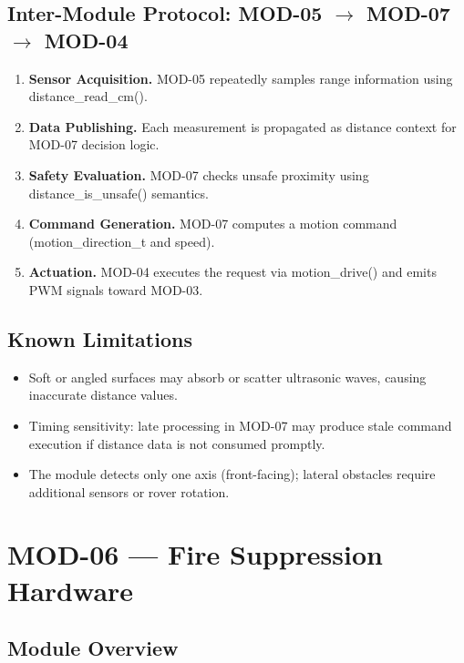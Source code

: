 \documentclass[12pt,a4paper]{article}
\newcommand{\fn}[1]{{\footnotesize\ttfamily #1}}
\begin{document}
\subsection{Inter-Module Protocol: MOD-05 $\rightarrow$ MOD-07 $\rightarrow$ MOD-04}

\begin{enumerate}[leftmargin=*, label=\textbf{Step \arabic*.}]
  \item \textbf{Sensor Acquisition.} MOD-05 repeatedly samples range information using \fn{distance\_read\_cm()}.
  \item \textbf{Data Publishing.} Each measurement is propagated as distance context for MOD-07 decision logic.
  \item \textbf{Safety Evaluation.} MOD-07 checks unsafe proximity using \fn{distance\_is\_unsafe()} semantics.
  \item \textbf{Command Generation.} MOD-07 computes a motion command (\fn{motion\_direction\_t} and speed).
  \item \textbf{Actuation.} MOD-04 executes the request via \fn{motion\_drive()} and emits PWM signals toward MOD-03.
\end{enumerate}

\subsection{Known Limitations}

\begin{itemize}[leftmargin=1.5em]
  \item Soft or angled surfaces may absorb or scatter ultrasonic waves, causing inaccurate distance values.
  \item Timing sensitivity: late processing in MOD-07 may produce stale command execution if distance data is not consumed promptly.
  \item The module detects only one axis (front-facing); lateral obstacles require additional sensors or rover rotation.
\end{itemize}

\newpage

\section{MOD-06 --- Fire Suppression Hardware}

\subsection{Module Overview}
\end{document}
